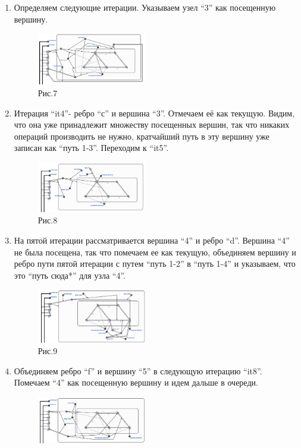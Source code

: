 \documentclass[10pt,a4paper,twocolumn]{article}
\begin{document}
\begin{enumerate}
	\item Определяем следующие итерации. Указываем узел ``3'' как посещенную вершину.
	\begin{figure}[h]
		\includegraphics[width=0.45\textwidth]{img/img7.png}
		\caption{Рис.7}
	\end{figure}
	\item Итерация ``it4''- ребро ``с'' и вершина ``3''. Отмечаем её как текущую. Видим, что она уже принадлежит множеству посещенных вершин, так что никаких операций производить не нужно, кратчайший путь в эту вершину уже записан как ``путь 1-3''. Переходим к ``it5''.
    \newpage
    \begin{figure}[h]
		\includegraphics[width=0.45\textwidth]{img/img8.png}
		\caption{Рис.8}
	\end{figure}
	\item На пятой итерации рассматривается вершина ``4'' и ребро ``d''. Вершина ``4'' не была посещена, так что помечаем ее как текущую, объединяем вершину и ребро пути пятой итерации с путем ``путь 1-2'' в ``путь 1-4'' и указываем, что это ``путь сюда*'' для узла ``4''. 
	\begin{figure}[h]
		\includegraphics[width=0.45\textwidth]{img/img9.png}
		\caption{Рис.9}
	\end{figure}
	\item Объединяем ребро ``f'' и вершину ``5'' в следующую итерацию ``it8''. Помечаем ``4'' как посещенную вершину и идем дальше в очереди.
	\begin{figure}[h]
		\includegraphics[width=0.45\textwidth]{img/img10.png}

\end{figure}
\end{enumerate}
\end{document}
